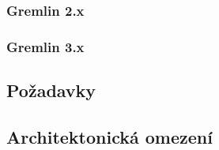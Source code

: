 \subsubsection{Gremlin 2.x}

\subsubsection{Gremlin 3.x} 

\subsection{Požadavky}




\subsection{Architektonická omezení}



